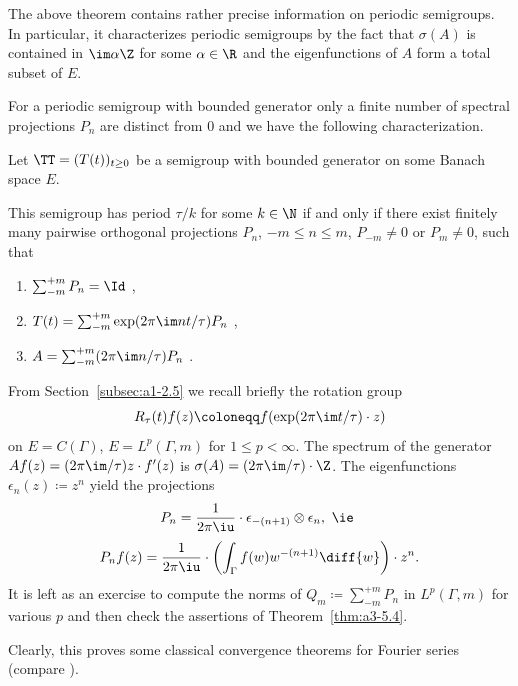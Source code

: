 The above theorem contains rather precise information on periodic semigroups.
In particular, it characterizes periodic semigroups by the fact that $\sigma(A)$ is contained in $\im\alpha\Z$ for some $\alpha \in \R$ and the eigenfunctions of\/ $A$ form a total subset of\/ $E$.

For a periodic semigroup with bounded generator
only a finite number of spectral projections $P_{n}$ are distinct from $0$ and we have the following characterization.
\begin{corollary}\label{cor:a3-5.5}
Let $\TT = (T(t))_{t \geq 0}$ be a semigroup with bounded generator on some Banach space $E$.

This semigroup has period $\tau/k$ for some $k \in \N$ if and only if there exist finitely many pairwise orthogonal projections $P_{n}$, $-m \leq n \leq m$, $P_{-m} \neq 0$ or $P_{m} \neq 0$, such that
\begin{enumerate}[\upshape (i)]
\item 
$\sum_{-m}^{+m} P_{n} =  \Id$ ,

\item 
$T(t) = \sum_{-m}^{+m} \exp(2\pi\im nt/\tau)P_{n}$ ,

\item 
$A = \sum_{-m}^{+m} (2\pi\im n/\tau)P_{n}$ .

\end{enumerate}
\end{corollary}
\begin{example}\label{ex:a3-5.6} 
From Section~\ref{subsec:a1-2.5} we recall briefly the rotation group
\[
R_{\tau}(t)f(z) \coloneqq f(\exp(2\pi\im t/\tau) \cdot z)
\]
on $E = C(\Gamma)$, \resp $E = L^{p}(\Gamma,m)$ for $1 \leq p < \infty$.
The spectrum of the generator\quad
$Af(z) = (2\pi\im /\tau)z \cdot f'(z)$\quad
is \quad $\sigma(A) = (2\pi\im /\tau) \cdot\Z$.
The eigenfunctions $\epsilon_{n}(z) \coloneqq z^{n}$ yield the projections
\[
P_{n} = \frac{1}{2\pi \iu} \cdot\epsilon_{-(n+1)} \otimes \epsilon_{n}, \text{ \ie }
\]
\[
P_{n}f(z) = \frac{1}{2\pi \iu}  \cdot \left( \int_{\Gamma} f(w)w^{-(n+1)} \diff{w} \right)\cdot z^{n} .
\]
It is left as an exercise to compute the norms of\/ $Q_{m} \coloneqq \sum_{-m}^{+m} P_{n}$ in $L^{p}(\Gamma,m)$ for various $p$ and then check the assertions of Theorem~\ref{thm:a3-5.4}.

Clearly, this proves some classical convergence theorems for Fourier series (compare \textcite[Chap.8.1]{davies:1980}).
\end{example}

